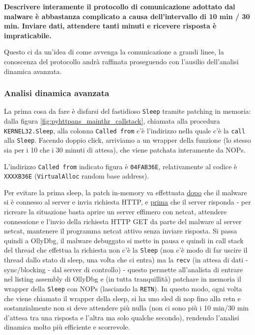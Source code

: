 \documentclass[
    a4paper, %
    11pt %
]{article}
\begin{document}
            \textbf{Descrivere interamente il protocollo di comunicazione adottato dal malware è abbastanza complicato a causa dell'intervallo di 10 min / 30 min. Inviare dati, attendere tanti minuti e ricevere risposta
            è impraticabile.}
            
            Questo ci da un'idea di come avvenga la comunicazione a grandi linee, la conoscenza del protocollo
            andrà raffinata proseguendo con l'ausilio dell'analisi dinamica avanzata.

            \subsubsection{Analisi dinamica avanzata}

            La prima cosa da fare è disfarsi del fastidioso \texttt{Sleep} tramite patching in memoria:
            dalla figura \ref{fig:pyhttpans_mainthr_callstack}, chiamata alla procedura \texttt{KERNEL32.Sleep},
            alla colonna \texttt{Called from} c'è l'indirizzo nella quale c'è la \texttt{call} alla \texttt{Sleep}.
            Facendo doppio click, arriviamo a un wrapper della funzione (lo stesso sia per i 10 che i 30 minuti di attesa), che viene patchata interamente da NOPs.

            L'indirizzo \texttt{Called from} indicato figura è \texttt{04FAB36E}, relativamente al codice è 
            \texttt{XXXXB36E} (\texttt{VirtualAlloc} random base address).

            Per evitare la prima sleep, la patch in-memory va effettuata \underline{dopo} che il malware si è 
            connesso al server e invia richiesta HTTP, e \underline{prima} che il server risponda - per ricreare la situazione basta aprire un server effimero con netcat, attendere connessione e l'invio della richiesta HTTP GET da parte del malware al server netcat, mantenere il programma netcat attivo senza inviare risposta. Si passa quindi a OllyDbg, il malware debuggato si mette in pausa e quindi in call stack del thread che effettua la richiesta non c'è la \texttt{Sleep} (non c'è modo di far uscire il thread dallo stato di sleep, una volta che ci entra) ma la \texttt{recv} (in attesa di dati - sync/blocking - dal server di controllo) - questo permette all'analista di entrare nel listing assembly di OllyDbg e (in tutta tranquillità) patchare in memoria il wrapper
            della \texttt{Sleep} con NOPs (lasciando la \texttt{RETN}). In questo modo, ogni volta che viene 
            chiamato il wrapper della sleep, si ha uno sled di nop fino alla retn e sostanzialmente non si deve attendere più nulla (non ci sono più i 10 min/30 min d'attesa tra una risposta e l'altra ma solo qualche secondo), rendendo l'analisi dinamica molto più efficiente e scorrevole.
\end{document}
